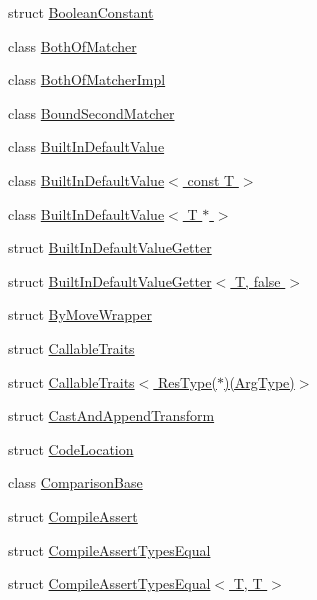 \begin{DoxyCompactItemize}
\item 
struct \hyperlink{structtesting_1_1internal_1_1BooleanConstant}{Boolean\+Constant}
\item 
class \hyperlink{classtesting_1_1internal_1_1BothOfMatcher}{Both\+Of\+Matcher}
\item 
class \hyperlink{classtesting_1_1internal_1_1BothOfMatcherImpl}{Both\+Of\+Matcher\+Impl}
\item 
class \hyperlink{classtesting_1_1internal_1_1BoundSecondMatcher}{Bound\+Second\+Matcher}
\item 
class \hyperlink{classtesting_1_1internal_1_1BuiltInDefaultValue}{Built\+In\+Default\+Value}
\item 
class \hyperlink{classtesting_1_1internal_1_1BuiltInDefaultValue_3_01const_01T_01_4}{Built\+In\+Default\+Value$<$ const T $>$}
\item 
class \hyperlink{classtesting_1_1internal_1_1BuiltInDefaultValue_3_01T_01_5_01_4}{Built\+In\+Default\+Value$<$ T $\ast$ $>$}
\item 
struct \hyperlink{structtesting_1_1internal_1_1BuiltInDefaultValueGetter}{Built\+In\+Default\+Value\+Getter}
\item 
struct \hyperlink{structtesting_1_1internal_1_1BuiltInDefaultValueGetter_3_01T_00_01false_01_4}{Built\+In\+Default\+Value\+Getter$<$ T, false $>$}
\item 
struct \hyperlink{structtesting_1_1internal_1_1ByMoveWrapper}{By\+Move\+Wrapper}
\item 
struct \hyperlink{structtesting_1_1internal_1_1CallableTraits}{Callable\+Traits}
\item 
struct \hyperlink{structtesting_1_1internal_1_1CallableTraits_3_01ResType_07_5_08_07ArgType_08_4}{Callable\+Traits$<$ Res\+Type($\ast$)(\+Arg\+Type)$>$}
\item 
struct \hyperlink{structtesting_1_1internal_1_1CastAndAppendTransform}{Cast\+And\+Append\+Transform}
\item 
struct \hyperlink{structtesting_1_1internal_1_1CodeLocation}{Code\+Location}
\item 
class \hyperlink{classtesting_1_1internal_1_1ComparisonBase}{Comparison\+Base}
\item 
struct \hyperlink{structtesting_1_1internal_1_1CompileAssert}{Compile\+Assert}
\item 
struct \hyperlink{structtesting_1_1internal_1_1CompileAssertTypesEqual}{Compile\+Assert\+Types\+Equal}
\item 
struct \hyperlink{structtesting_1_1internal_1_1CompileAssertTypesEqual_3_01T_00_01T_01_4}{Compile\+Assert\+Types\+Equal$<$ T, T $>$}

\end{DoxyCompactItemize}
